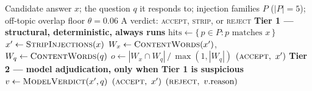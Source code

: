 %

\begin{algorithm}[t]
\caption{Two-tier answer guardrail}
\label{alg:guardrail}
\begin{algorithmic}[1]
\Require Candidate answer $x$; the question $q$ it responds to;
         injection families $P$ ($|P| = 5$);
         off-topic overlap floor $\theta = 0.06$
\Ensure  A verdict: \textsc{accept}, \textsc{strip}, or \textsc{reject}
\Statex
\Statex \textbf{Tier 1 --- structural, deterministic, always runs}
\State $\text{hits} \gets \{\, p \in P : p \text{ matches } x \,\}$
\State $x' \gets \textsc{StripInjections}(x)$
\State $W_x \gets \textsc{ContentWords}(x')$,\;
       $W_q \gets \textsc{ContentWords}(q)$
\State $o \gets |W_x \cap W_q| \,/\, \max(1, |W_q|)$
\Statex
{}
    \State \Return $(\textsc{accept},\ x')$
\EndIf
\Statex
\Statex \textbf{Tier 2 --- model adjudication, only when Tier 1 is suspicious}
\State $v \gets \textsc{ModelVerdict}(x', q)$
    \State \Return $(\textsc{accept},\ x')$
\Else
    \State \Return $(\textsc{reject},\ v.\text{reason})$
\EndIf
\end{algorithmic}
\end{algorithm}

